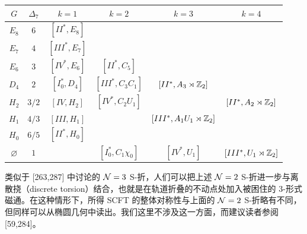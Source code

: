 \begin{center}
\small
\begin{tabular}{cccccc}
\toprule
$G$ & $\Delta_7$ & $k=1$ & $k=2$ & $k=3$ & $k=4$ \\
\midrule
$E_8$ & $6$   & $[II^*,E_8]$   & & & \\
$E_7$ & $4$   & $[III^*,E_7]$  & & & \\
$E_6$ & $3$   & $[IV^*,E_6]$   & $[II^*,C_5]$ & & \\
$D_4$ & $2$   & $[I_0^*,D_4]$  & $[III^*,C_3C_1]$ & $[II^*,A_3\rtimes\mathbb{Z}_2]$ & \\
$H_2$ & $3/2$ & $[IV,H_2]$     & $[IV^*,C_2U_1]$  & & $[II^*,A_2\rtimes\mathbb{Z}_2]$ \\
$H_1$ & $4/3$ & $[III,H_1]$    & & $[III^*,A_1U_1\rtimes\mathbb{Z}_2]$ & \\
$H_0$ & $6/5$ & $[II^*,H_0]$   & & & \\
$\varnothing$ & $1$ & & $[I_0^*,C_1\chi_0]$ & $[IV^*,U_1]$ & $[III^*,U_1\rtimes\mathbb{Z}_2]$ \\
\bottomrule
\end{tabular}
\end{center}


类似于 [263,287] 中讨论的 $\mathcal{N}=3$ S-折，人们可以把上述 $\mathcal{N}=2$ S-折进一步与离散挠（discrete torsion）结合，也就是在轨道折叠的不动点处加入被困住的 3-形式磁通。在这种情形下，所得 SCFT 的整体对称性与上面的 $\mathcal{N}=2$ S-折略有不同，但同样可以从椭圆几何中读出。我们这里不涉及这一方面，而建议读者参阅 [59,284]。

